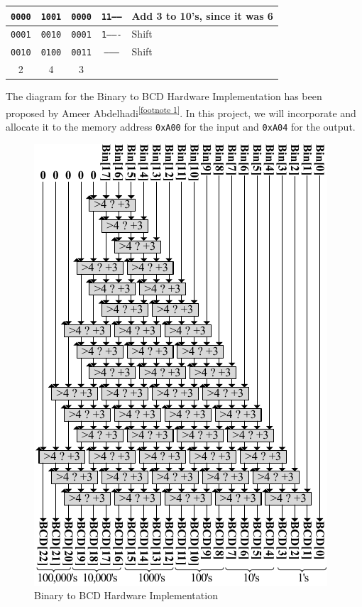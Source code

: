 \documentclass[12pt,a4paper,oneside]{book} %
\begin{document}
\begin{table}[H]
\begin{tabular}{|ccc|c|l|}
        \multicolumn{1}{|c|}{\texttt{0000}}  & \multicolumn{1}{c|}{\texttt{1001}} & \texttt{0000} & \texttt{11------}                & Add 3 to 10's, since it was 6               \\ \hline
        \multicolumn{1}{|c|}{\texttt{0001}}  & \multicolumn{1}{c|}{\texttt{0010}} & \texttt{0001} & \texttt{1-------}                & Shift                                       \\ \hline
        \multicolumn{1}{|c|}{\texttt{0010}}  & \multicolumn{1}{c|}{\texttt{0100}} & \texttt{0011} & \texttt{--------}                & Shift                                       \\ \hline
        \multicolumn{1}{|c|}{2}     & \multicolumn{1}{c|}{4}    & 3    & ~                       & ~                                           \\ \hline
    \end{tabular}
\end{table}

The diagram for the Binary to BCD Hardware Implementation has been proposed by Ameer Abdelhadi\textsuperscript{\ref{footnote 1}}. In this project, we will incorporate and allocate it to the memory address \texttt{0xA00} for the input and \texttt{0xA04} for the output.

\begin{figure}[H]
    \centering
    \includegraphics[width=.8\textwidth]{images/bin2bcd.pdf}
    \caption{Binary to BCD Hardware Implementation}
\end{figure}
\end{document}
